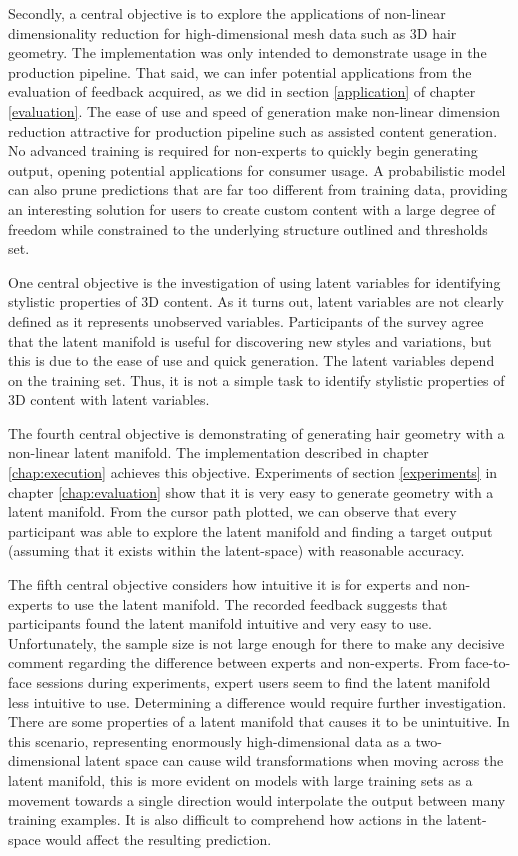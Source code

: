 \documentclass[ %
author={Dillon Keith Diep},
supervisor={Dr. Carl Henrik Ek},
degree={MEng},
title={ART-CG Hair:},
subtitle={Assisted Real-time Content Generation of Stylised Virtual Hair},
type={Research},
year={2017} ]{dissertation}
\begin{document}

Secondly, a central objective is to explore the applications of non-linear dimensionality reduction for high-dimensional mesh data such as 3D hair geometry.
The implementation was only intended to demonstrate usage in the production pipeline. That said, we can infer potential applications from the evaluation of feedback acquired, as we did in section \ref{application} of chapter \ref{evaluation}.
The ease of use and speed of generation make non-linear dimension reduction attractive for production pipeline such as assisted content generation.
No advanced training is required for non-experts to quickly begin generating output, opening potential applications for consumer usage.
A probabilistic model can also prune predictions that are far too different from training data, providing an interesting solution for users to create custom content with a large degree of freedom while constrained to the underlying structure outlined and thresholds set.

One central objective is the investigation of using latent variables for identifying stylistic properties of 3D content. As it turns out, latent variables are not clearly defined as it represents unobserved variables. Participants of the survey agree that the latent manifold is useful for discovering new styles and variations, but this is due to the ease of use and quick generation. The latent variables depend on the training set. Thus, it is not a simple task to identify stylistic properties of 3D content with latent variables.

The fourth central objective is demonstrating of generating hair geometry with a non-linear latent manifold. The implementation described in chapter \ref{chap:execution} achieves this objective. 
Experiments of section \ref{experiments} in chapter \ref{chap:evaluation} show that it is very easy to generate geometry with a latent manifold. From the cursor path plotted, we can observe that every participant was able to explore the latent manifold and finding a target output (assuming that it exists within the latent-space) with reasonable accuracy.

The fifth central objective considers how intuitive it is for experts and non-experts to use the latent manifold. The recorded feedback suggests that participants found the latent manifold intuitive and very easy to use. Unfortunately, the sample size is not large enough for there to make any decisive comment regarding the difference between experts and non-experts. From face-to-face sessions during experiments, expert users seem to find the latent manifold less intuitive to use. Determining a difference would require further investigation. There are some properties of a latent manifold that causes it to be unintuitive. In this scenario, representing enormously high-dimensional data as a two-dimensional latent space can cause wild transformations when moving across the latent manifold, this is more evident on models with large training sets as a movement towards a single direction would interpolate the output between many training examples. It is also difficult to comprehend how actions in the latent-space would affect the resulting prediction.
\end{document}

